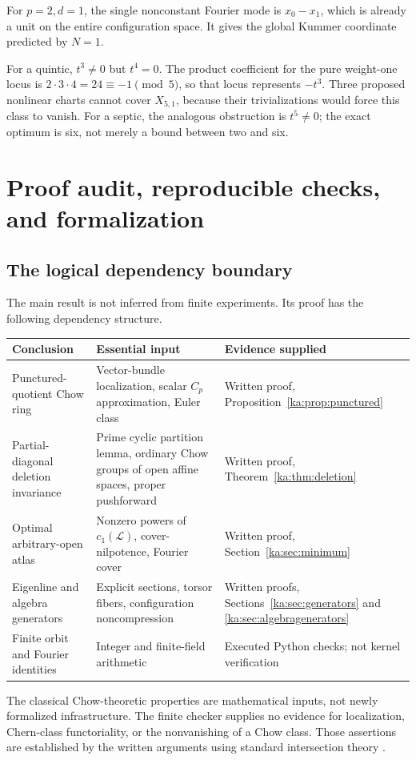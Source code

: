 \documentclass[11pt,a4paper]{article}
\theoremstyle{definition}
\theoremstyle{remark}
\newcommand{\LL}{\mathcal L}
\begin{document}
For $p=2,d=1$, the single nonconstant Fourier mode is $x_0-x_1$, which
is already a unit on the entire configuration space. It gives the global
Kummer coordinate predicted by $N=1$.

For a quintic, $t^3\neq0$ but $t^4=0$. The product coefficient for the
pure weight-one locus is $2\cdot3\cdot4=24\equiv-1\pmod5$, so that
locus represents $-t^3$. Three proposed nonlinear charts cannot cover
$X_{5,1}$, because their trivializations would force this class to vanish.
For a septic, the analogous obstruction is $t^5\neq0$; the exact optimum
is six, not merely a bound between two and six.

\section{Proof audit, reproducible checks, and formalization}
\label{ka:sec:audit}

\subsection{The logical dependency boundary}
The main result is not inferred from finite experiments. Its proof has
the following dependency structure.
\begin{center}
\small
\begin{tabularx}{\textwidth}{@{}>{\raggedright\arraybackslash}p{}Y>{\raggedright\arraybackslash}p{0.22\textwidth}@{}}
\toprule
Conclusion & Essential input & Evidence supplied\\
\midrule
Punctured-quotient Chow ring & Vector-bundle localization, scalar
$C_p$ approximation, Euler class & Written proof,
Proposition~\ref{ka:prop:punctured}\\
Partial-diagonal deletion invariance & Prime cyclic partition lemma,
ordinary Chow groups of open affine spaces, proper pushforward & Written
proof, Theorem~\ref{ka:thm:deletion}\\
Optimal arbitrary-open atlas & Nonzero powers of $c_1(\LL)$,
cover-nilpotence, Fourier cover & Written proof,
Section~\ref{ka:sec:minimum}\\
Eigenline and algebra generators & Explicit sections, torsor fibers,
configuration noncompression & Written proofs,
Sections~\ref{ka:sec:generators} and \ref{ka:sec:algebragenerators}\\
Finite orbit and Fourier identities & Integer and finite-field
arithmetic & Executed Python checks; not kernel verification\\
\bottomrule
\end{tabularx}
\end{center}
The classical Chow-theoretic properties are mathematical inputs, not
newly formalized infrastructure. The finite checker supplies no evidence
for localization, Chern-class functoriality, or the nonvanishing of a Chow
class. Those assertions are established by the written arguments using
standard intersection theory \cite{ka:Fulton,ka:Totaro,ka:EdidinGraham}.
\end{document}
